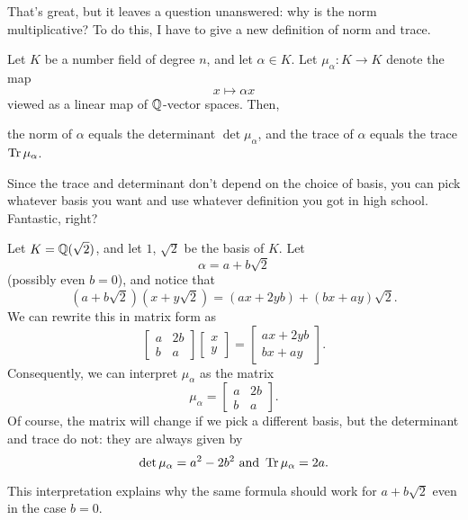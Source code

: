 That's great, but it leaves a question unanswered:
why is the norm multiplicative?
To do this, I have to give a new definition of norm and trace.

\begin{theorem}
	Let $K$ be a number field of degree $n$, and let $\alpha \in K$.
	Let $\mu_\alpha \colon K \to K$ denote the map \[ x \mapsto \alpha x \]
	viewed as a linear map of $\mathbb Q$-vector spaces.
	Then,
	\begin{itemize}
		\ii the norm of $\alpha$ equals the determinant $\det \mu_\alpha$, and
		\ii the trace of $\alpha$ equals the trace $\operatorname{Tr} \mu_\alpha$.
	\end{itemize}
\end{theorem}
Since the trace and determinant don't depend on the choice of basis,
you can pick whatever basis you want
and use whatever definition you got in high school.
Fantastic, right?

\begin{example}
	Let $K = \mathbb Q(\sqrt2)$, and let $1$, $\sqrt 2$ be the basis of $K$.
	Let \[ \alpha = a + b \sqrt 2 \] (possibly even $b = 0$), and notice that
	\[ \left( a+b\sqrt2 \right) \left(x+y\sqrt2 \right)
		= (ax+2yb) + (bx+ay)\sqrt2. \]
	We can rewrite this in matrix form as
	\[
		\begin{bmatrix}
			a & 2b \\
			b & a
		\end{bmatrix}
		\begin{bmatrix}
			x \\ y
		\end{bmatrix}
		=
		\begin{bmatrix}
			ax+2yb \\ bx+ay
		\end{bmatrix}.
	\]
	Consequently, we can interpret $\mu_\alpha$ as the matrix
	\[ \mu_\alpha =
		\begin{bmatrix}
			a & 2b \\ b & a
		\end{bmatrix}. \]
	Of course, the matrix will change if we pick a different basis,
	but the determinant and trace do not: they are always given by
	\[ \det \mu_\alpha = a^2-2b^2 \text{ and }
		\operatorname{Tr} \mu_\alpha = 2a. \]
\end{example}
This interpretation explains why the same formula should work for $a+b\sqrt 2$
even in the case $b = 0$.

